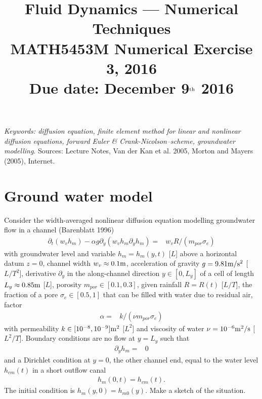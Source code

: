 \documentclass [12pt,english]{article}
\def\RF#1{figure~\ref{Fig.#1}}
\begin{document}
\title{\Large{\bf Fluid Dynamics --- Numerical Techniques}\\
{\bf MATH5453M Numerical Exercise 3, 2016}\\
{\small\bf Due date: December 9$^{\rm th}$ 2016}}
\author{}
\date{}

\maketitle

\vspace*{-2cm}\noindent
{\em Keywords: diffusion equation,
finite element method for linear and nonlinear diffusion equations,
forward Euler \& Crank-Nicolson--scheme, groundwater modelling}. 
Sources: Lecture Notes, Van der Kan et al. 2005, Morton and Mayers (2005), Internet.

\section{Ground water model}

Consider the width-averaged nonlinear diffusion equation modelling groundwater flow in a channel (Barenblatt 1996)
\begin{align}
\partial_t(w_v h_m)-\alpha g\partial_y(w_v h_m\partial_y h_m) =& {w_v R}/{(m_{por} \sigma_e)}\label{eqngroundw}
\end{align}
with groundwater level and variable $h_m=h_m(y,t)$ [$L$] above a horizontal datum $z=0$,
channel width $w_v\approx 0.1{\rm m}$, acceleration of gravity $g=9.81{\rm m}/{\rm s}^2$ [$L/T^2$], derivative $\partial_y$
in the along-channel direction $y\in[0,L_y]$ of a cell of length $L_y\approx 0.85{\rm m}$ [$L$], porosity $m_{por}\in[0.1,0.3]$,
given rainfall $R=R(t)$ [$L/T$], the fraction of a pore $\sigma_e\in[0.5,1]$ that can be filled with water due to residual air, factor
\begin{align}
\alpha =& {k}/{(\nu m_{por}\sigma_e)}
\end{align}
with permeability $k\in[10^{-8},10^{-9}]{\rm m}^2$ [$L^2$] and viscosity of water $\nu=10^{-6}{\rm m}^2/{\rm s}$ [$L^2/T$].
Boundary conditions are no flow at $y=L_y$ such that
\begin{align}
\partial_y h_m =& 0
\end{align}
and a Dirichlet condition at $y=0$, the other channel end, equal to the water level $h_{cm}(t)$ in a short outflow canal
\begin{align}
h_m(0,t) = h_{cm}(t).
\end{align}
The initial condition is $h_m(y,0)=h_{m0}(y)$. Make a sketch of the situation. %
\end{document}
